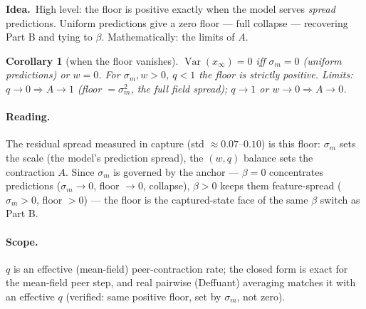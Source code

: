 \documentclass[11pt]{article}
\newtheorem{corollary}{Corollary}
\theoremstyle{definition}
\DeclareMathOperator{\Var}{Var}
\newcommand{\idea}[1]{\par\medskip\noindent\textbf{Idea.}\ #1\par\medskip}
\begin{document}
\idea{High level: the floor is positive exactly when the model serves \emph{spread}
predictions. Uniform predictions give a zero floor --- full collapse --- recovering Part
B and tying to $\beta$. Mathematically: the limits of $A$.}

\begin{corollary}[when the floor vanishes]\label{cor:floorzero}
$\Var(x_\infty)=0$ iff $\sigma_m=0$ (uniform predictions) or $w=0$. For $\sigma_m,w>0$,
$q<1$ the floor is strictly positive. Limits: $q\to0\Rightarrow A\to1$ (floor
$=\sigma_m^2$, the full field spread); $q\to1$ or $w\to0\Rightarrow A\to0$.
\end{corollary}

\paragraph{Reading.} The residual spread measured in capture (std $\approx0.07$--$0.10$)
is this floor: $\sigma_m$ sets the scale (the model's prediction spread), the $(w,q)$
balance sets the contraction $A$. Since $\sigma_m$ is governed by the anchor --- $\beta=0$
concentrates predictions ($\sigma_m\to0$, floor $\to0$, collapse), $\beta>0$ keeps them
feature-spread ($\sigma_m>0$, floor $>0$) --- the floor is the captured-state face of the
same $\beta$ switch as Part B.

\paragraph{Scope.} $q$ is an effective (mean-field) peer-contraction rate; the closed
form is exact for the mean-field peer step, and real pairwise (Deffuant) averaging
matches it with an effective $q$ (verified: same positive floor, set by $\sigma_m$, not
zero).
\end{document}
